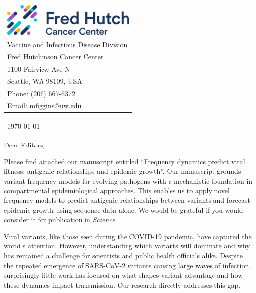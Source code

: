 \documentclass[11pt]{article}
\begin{document}
\thispagestyle{empty} %

\mbox{}\hfill
\begin{tabular}{l @{}}
	\includegraphics[width=6.5cm]{figures/fhcrc_logo} \\
	Vaccine and Infectious Disease Division \\
	Fred Hutchinson Cancer Center \\
	1100 Fairview Ave N \\
	Seattle, WA 98109, USA \\
	Phone: (206) 667-6372 \\
	Email: \href{mailto:mfiggins@uw.edu}{mfiggins@uw.edu} \\
\end{tabular}

\vspace{0.1in} %

\begin{tabular}{@{} l}
  \today
\end{tabular}

\vspace{0.1in} %

Dear Editors,

\medskip %

Please find attached our manuscript entitled ``Frequency dynamics predict viral fitness, antigenic relationships and epidemic growth''.
Our manuscript grounds variant frequency models for evolving pathogens with a mechanistic foundation in compartmental epidemiological approaches.
This enables us to apply novel frequency models to predict antigenic relationships between variants and forecast epidemic growth using sequence data alone.
We would be grateful if you would consider it for publication in \textit{Science}.

Viral variants, like those seen during the COVID-19 pandemic, have captured the world’s attention.
However, understanding which variants will dominate and why has remained a challenge for scientists and public health officials alike.
Despite the repeated emergence of SARS-CoV-2 variants causing large waves of infection, surprisingly little work has focused on what shapes variant advantage and how these dynamics impact transmission.
Our research directly addresses this gap.
\end{document}
